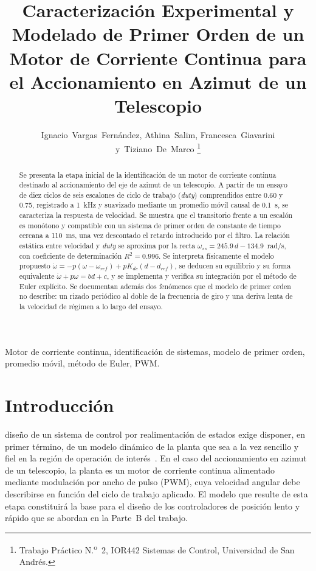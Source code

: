 \documentclass[journal,10pt,a4paper]{IEEEtran}
\begin{document}
\title{Caracterización Experimental y Modelado de Primer Orden de un Motor de Corriente Continua para el Accionamiento en Azimut de un Telescopio}

\author{Ignacio~Vargas~Fernández, Athina~Salim, Francesca~Giavarini y~Tiziano~De~Marco%
\thanks{Trabajo Práctico N.\textsuperscript{o}~2, IOR442 Sistemas de Control, Universidad de San Andrés.}}


\maketitle

\begin{abstract}
Se presenta la etapa inicial de la identificación de un motor de corriente continua destinado al accionamiento del eje de azimut de un telescopio. A partir de un ensayo de diez ciclos de seis escalones de ciclo de trabajo (\emph{duty}) comprendidos entre 0.60 y 0.75, registrado a \SI{1}{kHz} y suavizado mediante un promedio móvil causal de \SI{0.1}{s}, se caracteriza la respuesta de velocidad. Se muestra que el transitorio frente a un escalón es monótono y compatible con un sistema de primer orden de constante de tiempo cercana a \SI{110}{ms}, una vez descontado el retardo introducido por el filtro. La relación estática entre velocidad y \emph{duty} se aproxima por la recta $\omega_{ss}=245.9\,d-134.9$~rad/s, con coeficiente de determinación $R^2=0.996$. Se interpreta físicamente el modelo propuesto $\dot\omega=-p(\omega-\omega_{ref})+pK_{dc}(d-d_{ref})$, se deducen su equilibrio y su forma equivalente $\dot\omega+p\omega=bd+c$, y se implementa y verifica su integración por el método de Euler explícito. Se documentan además dos fenómenos que el modelo de primer orden no describe: un rizado periódico al doble de la frecuencia de giro y una deriva lenta de la velocidad de régimen a lo largo del ensayo.
\end{abstract}

\begin{IEEEkeywords}
Motor de corriente continua, identificación de sistemas, modelo de primer orden, promedio móvil, método de Euler, PWM.
\end{IEEEkeywords}

\section{Introducción}
 diseño de un sistema de control por realimentación de estados exige disponer, en primer término, de un modelo dinámico de la planta que sea a la vez sencillo y fiel en la región de operación de interés~\cite{ogata,franklin,astrom}. En el caso del accionamiento en azimut de un telescopio, la planta es un motor de corriente continua alimentado mediante modulación por ancho de pulso (PWM), cuya velocidad angular debe describirse en función del ciclo de trabajo aplicado. El modelo que resulte de esta etapa constituirá la base para el diseño de los controladores de posición lento y rápido que se abordan en la Parte~B del trabajo.
\end{document}
